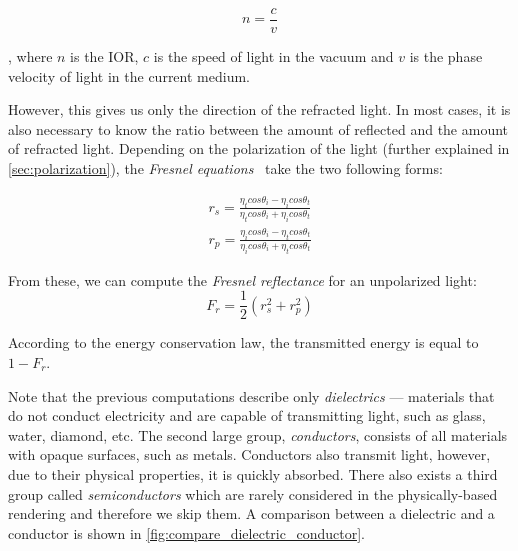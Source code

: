 \begin{equation}
n=\frac{c}{v}
\end{equation}

, where $n$ is the IOR, $c$ is the speed of light in the vacuum and $v$ is the phase velocity of light in the current medium.

However, this gives us only the direction of the refracted light. In most cases, it is also necessary to know the ratio between the amount of reflected and the amount of refracted light. Depending on the polarization of the light (further explained in \autoref{sec:polarization}), the \emph{Fresnel equations}~\cite{pharr2016physically} take the two following forms:

\begin{align*}
r_s = \frac{\eta_t cos\theta_i - \eta_i cos\theta_t}{\eta_t cos\theta_i + \eta_i cos\theta_t}\\
r_p = \frac{\eta_i cos\theta_i - \eta_t cos\theta_t}{\eta_i cos\theta_i + \eta_t cos\theta_t} 
\end{align*}

From these, we can compute the \emph{Fresnel reflectance} for an unpolarized light:
\begin{equation}
F_r=\frac{1}{2}(r_s^2 + r_p^2)
\end{equation}

According to the energy conservation law, the transmitted energy is equal to $1-F_r$.

Note that the previous computations describe only \emph{dielectrics} --- materials that do not conduct electricity and are capable of transmitting light, such as glass, water, diamond, etc. The second large group, \emph{conductors}, consists of all materials with opaque surfaces, such as metals. Conductors also transmit light, however, due to their physical properties, it is quickly absorbed. There also exists a third group called \emph{semiconductors} which are rarely considered in the physically-based rendering and therefore we skip them. A comparison between a dielectric and a conductor is shown in \autoref{fig:compare_dielectric_conductor}.

